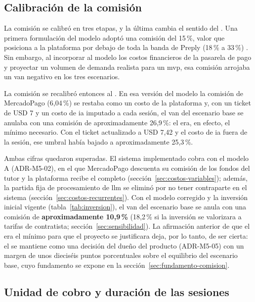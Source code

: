 \subsection{Calibración de la comisión}\label{sec:calibracion-comision}

La comisión se calibró en tres etapas, y la última cambia el sentido del
\comision{}. Una primera formulación del modelo adoptó una comisión del
15\,\%, valor que posiciona a la plataforma por debajo de toda la banda de
Preply (18\,\% a 33\,\%) \citep{preply}. Sin embargo, al incorporar al
modelo los costos financieros de la pasarela de pago y proyectar un
volumen de demanda realista para un \gls{mvp}, esa comisión arrojaba un
\gls{van} negativo en los tres escenarios.

La comisión se recalibró entonces al \comision{}. En esa versión del
modelo la comisión de MercadoPago (6,04\,\%) se restaba como un costo de
la plataforma y, con un ticket de USD 7 y un costo de \gls{ia} imputado a
cada sesión, el \gls{van} del escenario base se anulaba con una comisión
de aproximadamente 26,9\,\%: el \comision{} era, en efecto, el mínimo
necesario. Con el ticket actualizado a USD 7,42 y el costo de \gls{ia}
fuera de la sesión, ese umbral había bajado a aproximadamente 25,3\,\%.

Ambas cifras quedaron superadas. El sistema implementado cobra con el
modelo A (ADR-M5-02), en el que MercadoPago descuenta su comisión de los
fondos del tutor y la plataforma recibe el \comision{} completo
(sección~\ref{sec:costos-variables}); además, la partida fija de
procesamiento de \gls{llm} se eliminó por no tener contraparte en el
sistema (sección~\ref{sec:costos-recurrentes}). Con el modelo corregido
y la inversión inicial vigente (tabla~\ref{tab:inversion}), el
\gls{van} del escenario base se anula con una comisión de
\textbf{aproximadamente 10,9\,\%} (18,2\,\% si la inversión se valorizara
a tarifas de contratista; sección~\ref{sec:sensibilidad}). La afirmación anterior de que el
\comision{} era el mínimo para que el proyecto se justificara deja, por lo
tanto, de ser cierta: el \comision{} se mantiene como una decisión del
dueño del producto (ADR-M5-05) con un margen de unos dieciséis puntos
porcentuales sobre el equilibrio del escenario base, cuyo fundamento se
expone en la sección~\ref{sec:fundamento-comision}.

\subsection{Unidad de cobro y duración de las sesiones}

